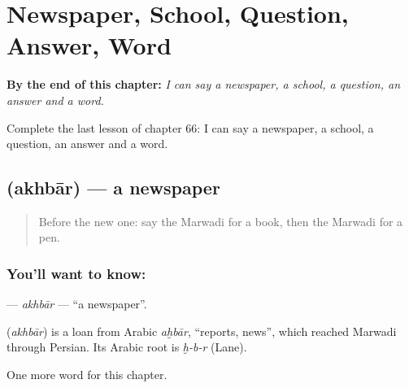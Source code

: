 
\chapter{Newspaper, School, Question, Answer, Word}
\label{ch:mw-newspaper-school-question-answer-word}

\begin{chapteropening}
\textbf{By the end of this chapter:} \emph{I can say a newspaper, a school, a question, an answer and a word.}

Complete the last lesson of chapter 66: I can say a newspaper, a school, a question, an answer and a word.
\end{chapteropening}

\section[\texorpdfstring{\mw{अखबार} (akhbār)}{अखबार (akhbār)}]{ (akhbār) — a newspaper}

\label{lesson:MW-C66-akhbar}



\begin{quote}
Before the new one: say the Marwadi for a book, then the Marwadi for a pen.
\end{quote}

\subsection*{You'll want to know: }
\textbf{} — \emph{akhbār} — \textquotedblleft{}a newspaper\textquotedblright{}.

\begin{cousinweb}
\textbf{} (\emph{akhbār}) is a loan from Arabic \emph{aḫbār}, \textquotedblleft{}reports, news\textquotedblright{}, which reached Marwadi through Persian. Its Arabic root is \emph{ḫ-b-r} (Lane).
\end{cousinweb}

\begin{grammarlens}[title={What you've built}]
One more word for this chapter.
\end{grammarlens}

